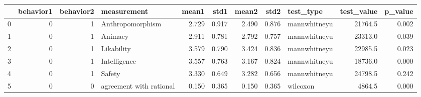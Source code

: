 \begin{tabular}{lrrlrrrrlrr}
\toprule
{} &  behavior1 &  behavior2 &              measurement &  mean1 &   std1 &  mean2 &   std2 &     test\_type &  test\_value &  p\_value \\
\midrule
0 &          0 &          1 &         Anthropomorphism &  2.729 &  0.917 &  2.490 &  0.876 &  mannwhitneyu &     21764.5 &    0.002 \\
1 &          0 &          1 &                  Animacy &  2.911 &  0.781 &  2.792 &  0.757 &  mannwhitneyu &     23313.0 &    0.039 \\
2 &          0 &          1 &               Likability &  3.579 &  0.790 &  3.424 &  0.836 &  mannwhitneyu &     22985.5 &    0.023 \\
3 &          0 &          1 &             Intelligence &  3.557 &  0.763 &  3.167 &  0.824 &  mannwhitneyu &     18736.0 &    0.000 \\
4 &          0 &          1 &                   Safety &  3.330 &  0.649 &  3.282 &  0.656 &  mannwhitneyu &     24798.5 &    0.242 \\
5 &          0 &          0 &  agreement with rational &  0.150 &  0.365 &  0.150 &  0.365 &      wilcoxon &      4864.5 &    0.000 \\
\bottomrule
\end{tabular}
